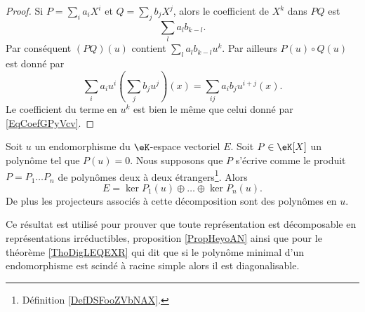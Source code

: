 \begin{proof}
    Si \( P=\sum_i a_iX^i\) et \( Q=\sum_j b_jX^j\), alors le coefficient de \( X^k\) dans \( PQ\) est
    \begin{equation}        \label{EqCoefGPyVcv}
        \sum_la_lb_{k-l}.
    \end{equation}
    Par conséquent \( (PQ)(u)\) contient \( \sum_la_lb_{k-l}u^k\). Par ailleurs \( P(u)\circ Q(u)\) est donné par
    \begin{equation}
        \sum_ia_iu^i\left( \sum_jb_ju^j \right)(x)=\sum_{ij}a_ib_ju^{i+j}(x).
    \end{equation}
    Le coefficient du terme en \( u^k\) est bien le même que celui donné par \eqref{EqCoefGPyVcv}.
\end{proof}

\begin{theorem}       \label{ThoDecompNoyayzzMWod}
    Soit \( u\) un endomorphisme du \( \eK\)-espace vectoriel \( E\). Soit \( P\in\eK[X]\) un polynôme tel que \( P(u)=0\). Nous supposons que \( P\) s'écrive comme le produit \( P=P_1\ldots P_n\) de polynômes deux à deux étrangers\footnote{Définition \ref{DefDSFooZVbNAX}.}. Alors
    \begin{equation}
        E=\ker P_1(u)\oplus\ldots\oplus\ker P_n(u).
    \end{equation}
    De plus les projecteurs associés à cette décomposition sont des polynômes en \( u\).
\end{theorem}
Ce résultat est utilisé pour prouver que toute représentation est décomposable en représentations irréductibles, proposition \ref{PropHeyoAN} ainsi que pour le théorème \ref{ThoDigLEQEXR} qui dit que si le polynôme minimal d'un endomorphisme est scindé à racine simple alors il est diagonalisable.

